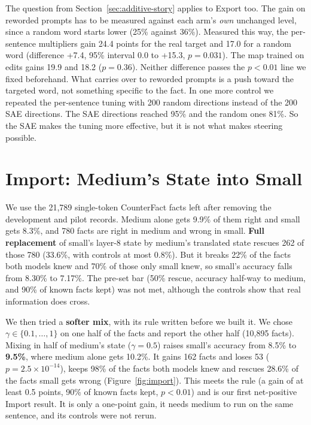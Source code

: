 The question from Section~\ref{sec:additive-story} applies to Export too. The gain on reworded prompts has to be measured against each arm's \emph{own} unchanged level, since a random word starts lower (25\% against 36\%). Measured this way, the per-sentence multipliers gain 24.4 points for the real target and 17.0 for a random word (difference +7.4, 95\% interval 0.0 to +15.3, $p=0.031$). The map trained on edits gains 19.9 and 18.2 ($p=0.36$). Neither difference passes the $p<0.01$ line we fixed beforehand. What carries over to reworded prompts is a push toward the targeted word, not something specific to the fact. In one more control we repeated the per-sentence tuning with 200 random directions instead of the 200 SAE directions. The SAE directions reached 95\% and the random ones 81\%. So the SAE makes the tuning more effective, but it is not what makes steering possible.

\section{Import: Medium's State into Small}\label{sec:import}

We use the 21,789 single-token CounterFact facts left after removing the development and pilot records. Medium alone gets 9.9\% of them right and small gets 8.3\%, and 780 facts are right in medium and wrong in small. \textbf{Full replacement} of small's layer-8 state by medium's translated state rescues 262 of those 780 (33.6\%, with controls at most 0.8\%). But it breaks 22\% of the facts both models knew and 70\% of those only small knew, so small's accuracy falls from 8.30\% to 7.17\%. The pre-set bar (50\% rescue, accuracy half-way to medium, and 90\% of known facts kept) was not met, although the controls show that real information does cross.

We then tried a \textbf{softer mix}, with its rule written before we built it. We chose $\gamma\in\{0.1,\dots,1\}$ on one half of the facts and report the other half (10,895 facts). Mixing in half of medium's state ($\gamma=0.5$) raises small's accuracy from 8.5\% to \textbf{9.5\%}, where medium alone gets 10.2\%. It gains 162 facts and loses 53 ($p=2.5\times10^{-14}$), keeps 98\% of the facts both models knew and rescues 28.6\% of the facts small gets wrong (Figure~\ref{fig:import}). This meets the rule (a gain of at least 0.5 points, 90\% of known facts kept, $p<0.01$) and is our first net-positive Import result. It is only a one-point gain, it needs medium to run on the same sentence, and its controls were not rerun.

